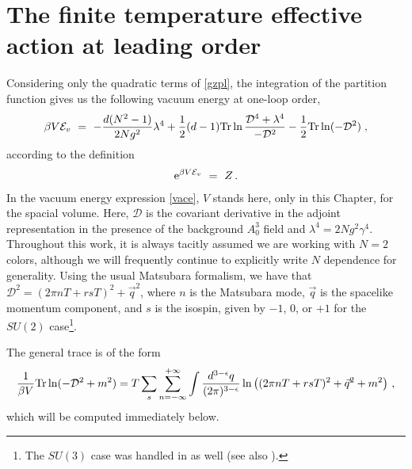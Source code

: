 \section{The finite temperature effective action at leading order}
\label{sec4}

Considering only the quadratic terms of \eqref{gzpl}, the integration of the
partition function gives us the following vacuum energy at one-loop order,
\begin{equation}
\beta V\mathcal{E}_{v} ~=~ -\frac{d(N^{2}-1)}{2Ng^{2}}\lambda ^{4}+\frac{1}{2}%
(d-1)\tr\ln \frac{\mathcal{D}^{4}+\lambda ^{4}}{-\mathcal{D}^{2}}-\frac{1}{2}%
\tr\ln (-\mathcal{D}^{2})\;,  \label{vace}
\end{equation}%
according to the definition 
\begin{eqnarray}
\mathrm{e}^{\beta V{\cal E}_{v}} ~=~ Z\,.
\end{eqnarray}
In the vacuum energy expression \eqref{vace}, $V$ stands here, only in this Chapter, for the
spacial volume. Here, $\mathcal{D}$ is the covariant derivative in the adjoint representation
in the presence of the background $A_{0}^{3}$ field and $\lambda ^{4}=2Ng^{2}\gamma ^{4}$.
Throughout this work, it is always tacitly assumed we are working with $N=2$ colors, although
we will frequently continue to explicitly write $N$ dependence for generality. Using the usual
Matsubara formalism, we have that $\mathcal{D}^{2}=(2\pi nT+rsT)^{2}+\vec{q}^{2}$, where $n$ is
the Matsubara mode, $\vec{q}$ is the spacelike momentum component, and $s$ is the isospin,
given by $-1$, $0$, or $+1$ for the $SU(2)$ case\footnote{The $SU(3)$ case was handled in
\cite{Reinosa:2014ooa} as well (see also \cite{Serreau:2015saa}).}.

The general trace is of the form
\begin{equation}  \label{1}
\frac{1}{\beta V}\mathrm{Tr}\ln (-\mathcal{D}^2 + m^2) = T \sum_s
\sum_{n=-\infty}^{+\infty}\int\frac{ d^{3-\epsilon}q}{(2\pi)^{3-\epsilon}}
\ln \left((2\pi nT + rsT)^2+\vec{q}^2+m^2\right)\,,
\end{equation}
which will be computed immediately below.

